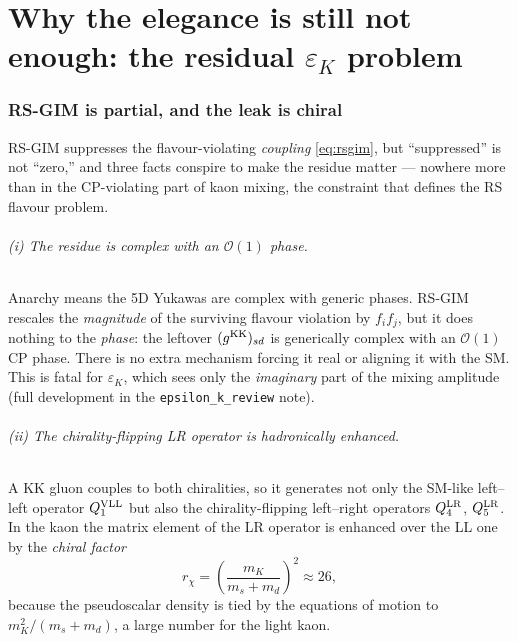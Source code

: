 \documentclass[11pt]{article}
\newcommand{\epsK}{\varepsilon_K}
\newcommand{\code}[1]{\texttt{#1}}
\theoremstyle{definition}
\begin{document}
\part{Why the elegance is still not enough: the residual $\epsK$ problem}
\label{part:gap}

\section{RS-GIM is partial, and the leak is chiral}
\label{sec:partial}

RS-GIM suppresses the flavour-violating \emph{coupling} \eqref{eq:rsgim}, but
``suppressed'' is not ``zero,'' and three facts conspire to make the residue
matter --- nowhere more than in the CP-violating part of kaon mixing, the
constraint that defines the RS flavour problem.

\paragraph{(i) The residue is complex with an $\mathcal{O}(1)$ phase.} Anarchy
means the 5D Yukawas are complex with generic phases. RS-GIM rescales the
\emph{magnitude} of the surviving flavour violation by $f_i f_j$, but it does
nothing to the \emph{phase}: the leftover $(g^{\rm KK})_{sd}$ is generically
complex with an $\mathcal{O}(1)$ CP phase. There is no extra mechanism forcing it
real or aligning it with the SM. This is fatal for $\epsK$, which sees only the
\emph{imaginary} part of the mixing amplitude (full development in the
\code{epsilon\_k\_review} note).

\paragraph{(ii) The chirality-flipping LR operator is hadronically enhanced.} A
KK gluon couples to both chiralities, so it generates not only the SM-like
left--left operator $Q_1^{\rm VLL}$ but also the chirality-flipping left--right
operators $Q_4^{\rm LR}$, $Q_5^{\rm LR}$. In the kaon the matrix element of the LR
operator is enhanced over the LL one by the \emph{chiral factor}
\begin{equation}
r_\chi=\left(\frac{m_K}{m_s+m_d}\right)^2\approx 26,
\label{eq:chiral}
\end{equation}
because the pseudoscalar density is tied by the equations of motion to
$m_K^2/(m_s+m_d)$, a large number for the light kaon.
\end{document}
